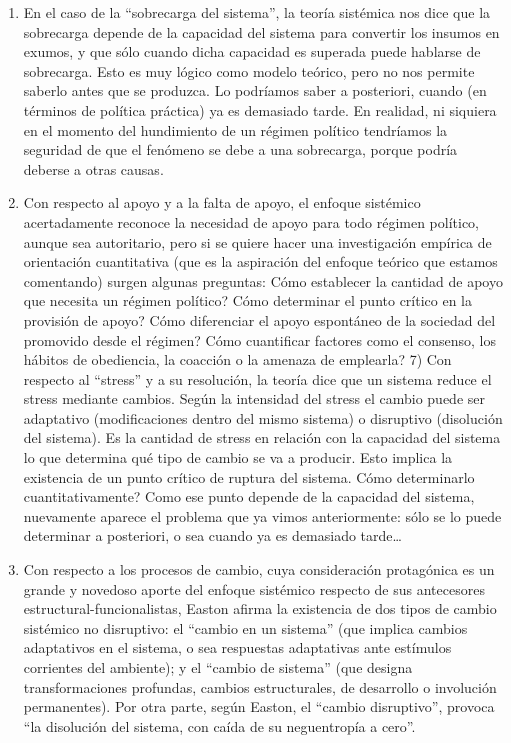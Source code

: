 \documentclass[
]{book}
\begin{document}
\begin{enumerate}
\def\labelenumi{\arabic{enumi})}
\setcounter{enumi}{4}
\item
  En el caso de la ``sobrecarga del sistema'', la teoría sistémica nos dice que la sobrecarga depende de la capacidad del sistema para convertir los insumos en exumos, y que sólo cuando dicha capacidad es superada puede hablarse de sobrecarga. Esto es muy lógico como modelo teórico, pero no nos permite saberlo antes que se produzca. Lo podríamos saber a posteriori, cuando (en términos de política práctica) ya es demasiado tarde. En realidad, ni siquiera en el momento del hundimiento de un régimen político tendríamos la seguridad de que el fenómeno se debe a una sobrecarga, porque podría deberse a otras causas.
\item
  Con respecto al apoyo y a la falta de apoyo, el enfoque sistémico acertadamente reconoce la necesidad de apoyo para todo régimen político, aunque sea autoritario, pero si se quiere hacer una investigación empírica de orientación cuantitativa (que es la aspiración del enfoque teórico que estamos comentando) surgen algunas preguntas: Cómo establecer la cantidad de apoyo que necesita un régimen político? Cómo determinar el punto crítico en la provisión de apoyo? Cómo diferenciar el apoyo espontáneo de la sociedad del promovido desde el régimen? Cómo cuantificar factores como el consenso, los hábitos de obediencia, la coacción o la amenaza de emplearla? 7) Con respecto al ``stress'' y a su resolución, la teoría dice que un sistema reduce el stress mediante cambios. Según la intensidad del stress el cambio puede ser adaptativo (modificaciones dentro del mismo sistema) o disruptivo (disolución del sistema). Es la cantidad de stress en relación con la capacidad del sistema lo que determina qué tipo de cambio se va a producir. Esto implica la existencia de un punto crítico de ruptura del sistema. Cómo determinarlo cuantitativamente? Como ese punto depende de la capacidad del sistema, nuevamente aparece el problema que ya vimos anteriormente: sólo se lo puede determinar a posteriori, o sea cuando ya es demasiado tarde\ldots{}
\item
  Con respecto a los procesos de cambio, cuya consideración protagónica es un grande y novedoso aporte del enfoque sistémico respecto de sus antecesores estructural-funcionalistas, Easton afirma la existencia de dos tipos de cambio sistémico no disruptivo: el ``cambio en un sistema'' (que implica cambios adaptativos en el sistema, o sea respuestas adaptativas ante estímulos corrientes del ambiente); y el ``cambio de sistema'' (que designa transformaciones profundas, cambios estructurales, de desarrollo o involución permanentes). Por otra parte, según Easton, el ``cambio disruptivo'', provoca ``la disolución del sistema, con caída de su neguentropía a cero''.
\end{enumerate}
\end{document}
